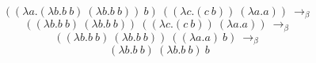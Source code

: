 \documentclass[12pt]{article}
\begin{document}
	$$ ((\lambda a.(\lambda b.b\ b)\ (\lambda b.b\ b))\ b)\ ((\lambda c.(c\ b))\ (\lambda a.a))\ \to _\beta \ $$
	$$ ((\lambda b.b\ b)\ (\lambda b.b\ b))\ ((\lambda c.(c\ b))\ (\lambda a.a))\ \to _\beta \ $$ 
	$$ ((\lambda b.b\ b)\ (\lambda b.b\ b))\ ((\lambda a.a)\ b)\ \to_\beta \ $$
	$$ (\lambda b.b\ b)\ (\lambda b.b\ b)\ b $$
\end{document}
